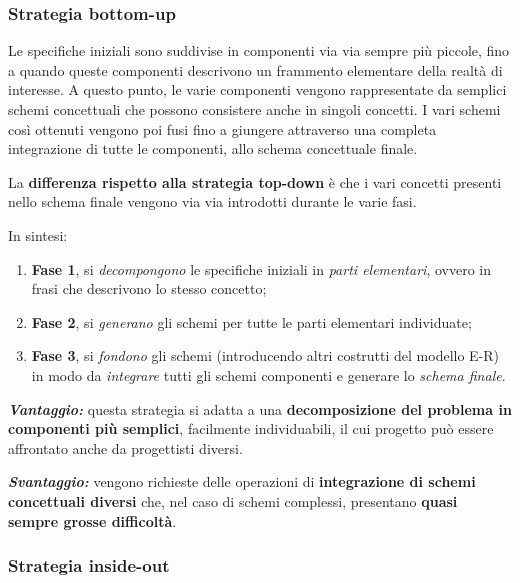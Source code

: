 \documentclass[a4paper]{article}
\begin{document}
	\subsubsection{Strategia bottom-up}
	
	Le specifiche iniziali sono suddivise in componenti via via sempre più piccole, fino a quando queste componenti descrivono un frammento elementare della realtà di interesse. A questo punto, le varie componenti vengono rappresentate da semplici schemi concettuali che possono consistere anche in singoli concetti. I vari schemi così ottenuti vengono poi fusi fino a giungere attraverso una completa integrazione di tutte le componenti, allo schema concettuale finale.
	
	La \textbf{differenza rispetto alla strategia top-down} è che i vari concetti presenti nello schema finale vengono via via introdotti durante le varie fasi.\newline
	
	\noindent
	In sintesi:
	
	\begin{enumerate}
		\item \textbf{Fase 1}, si \emph{decompongono} le specifiche iniziali in \emph{parti elementari}, ovvero in frasi che descrivono lo stesso concetto;
		
		\item \textbf{Fase 2}, si \emph{generano} gli schemi per tutte le parti elementari individuate;
		
		\item \textbf{Fase 3}, si \emph{fondono} gli schemi (introducendo altri costrutti del modello E-R) in modo da \emph{integrare} tutti gli schemi componenti e generare lo \emph{schema finale}.
	\end{enumerate}

	\noindent
	\textcolor{Green4}{\textbf{\emph{Vantaggio:}}} questa strategia si adatta a una \textbf{decomposizione del problema in componenti più semplici}, facilmente individuabili, il cui progetto può essere affrontato anche da progettisti diversi.\newline
	
	\noindent
	\textcolor{Red3}{\textbf{\emph{Svantaggio:}}} vengono richieste delle operazioni di \textbf{integrazione di schemi concettuali diversi} che, nel caso di schemi complessi, presentano \textbf{quasi sempre grosse difficoltà}.
	
	\newpage
	
	\subsubsection{Strategia inside-out}
	
\end{document}
